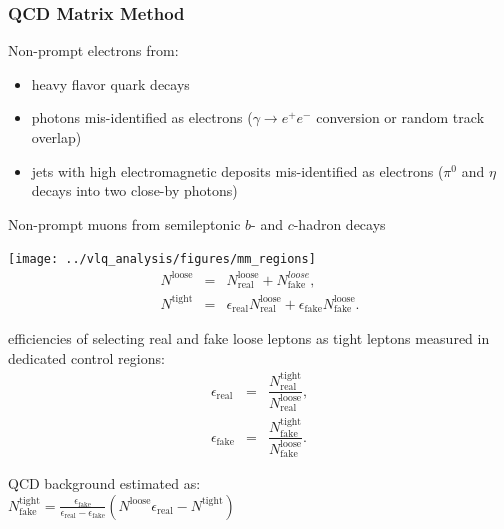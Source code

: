 \begin{frame}\frametitle{QCD Matrix Method}
\centering\scriptsize

Non-prompt electrons from:
\begin{itemize}
\item heavy flavor quark decays
\item photons mis-identified as electrons ($\gamma\to e^+ e^-$ conversion or random track overlap)
\item jets with high electromagnetic deposits mis-identified as electrons ($\pi^0$ and $\eta$ decays into two close-by photons)
\end{itemize} 

Non-prompt muons from semileptonic $b$- and $c$-hadron decays

\begin{minipage}{.35\textwidth}\centering

\texttt{[image: ../vlq\_analysis/figures/mm\_regions]}
\begin{eqnarray*}
N^\mathrm{loose} & = & N^\mathrm{loose}_\mathrm{real} + N^{loose}_\mathrm{fake}, \\
N^\mathrm{tight} & = & \epsilon_\mathrm{real}N^\mathrm{loose}_\mathrm{real} + \epsilon_\mathrm{fake}N^\mathrm{loose}_\mathrm{fake}.
\end{eqnarray*}

\end{minipage}\begin{minipage}{.65\textwidth}\centering

efficiencies of selecting real and fake loose leptons as tight leptons measured in dedicated control regions:
\begin{eqnarray*}
\epsilon_\mathrm{real} & = & \dfrac{N^\mathrm{tight}_\mathrm{real}}{N^\mathrm{loose}_\mathrm{real}}, \\
\epsilon_\mathrm{fake} & = & \dfrac{N^\mathrm{tight}_\mathrm{fake}}{N^\mathrm{loose}_\mathrm{fake}}.
\end{eqnarray*}

QCD background estimated as:\\
$N^\mathrm{tight}_\mathrm{fake} = \frac{\epsilon_\mathrm{fake}}{\epsilon_\mathrm{real} - \epsilon_\mathrm{fake}}(N^\mathrm{loose} \epsilon_\mathrm{real} - N^\mathrm{tight})$

\end{minipage}


\end{frame}



